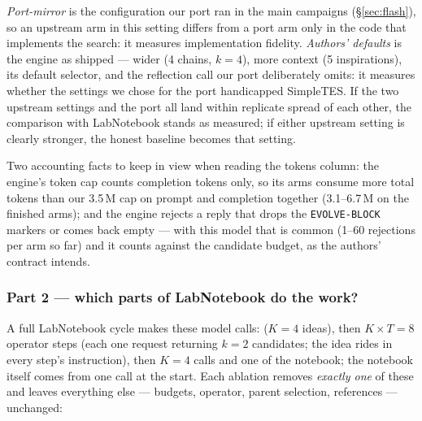 \emph{Port-mirror} is the configuration our port ran in the main campaigns (\S\ref{sec:flash}),
so an upstream arm in this setting differs from a port arm only in the code that implements the
search: it measures implementation fidelity. \emph{Authors' defaults} is the engine as shipped
--- wider (4 chains, $k{=}4$), more context (5 inspirations), its default selector, and the
reflection call our port deliberately omits: it measures whether the settings we chose for the
port handicapped SimpleTES. If the two upstream settings and the port all land within replicate
spread of each other, the comparison with LabNotebook stands as measured; if either upstream
setting is clearly stronger, the honest baseline becomes that setting.

Two accounting facts to keep in view when reading the tokens column: the engine's token cap counts
completion tokens only, so its arms consume more total tokens than our 3.5\,M cap on prompt
and completion together (3.1--6.7\,M on the finished arms); and the engine rejects a reply that drops the
\texttt{EVOLVE-BLOCK} markers or comes back empty --- with this model that is common (1--60
rejections per arm so far) and it counts against the candidate budget, as the authors' contract
intends.

\subsubsection*{Part 2 --- which parts of LabNotebook do the work?}

A full LabNotebook cycle makes these model calls:  ($K{=}4$ ideas), then $K \times
T = 8$ operator steps (each one request returning $k{=}2$ candidates; the idea rides in every
step's instruction), then $K = 4$  calls and one  of the notebook; the
notebook itself comes from one  call at the start. Each ablation removes
\emph{exactly one} of these and leaves everything else --- budgets, operator, parent selection,
references --- unchanged:


